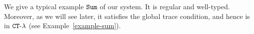 %
%



We give a typical example ${\tt Sum}$ of our system. It is regular and well-typed.
Moreover, as we will see later, it satisfies the global trace condition,
and hence is in ${ {\tt CT}\mbox{-}\lambda}$ (see Example~\ref{example-sum}). 


